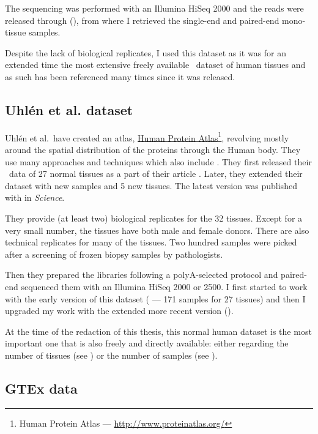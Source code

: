 The sequencing was performed with an Illumina HiSeq 2000 and the reads were
released through  (), from where I
retrieved the single-end and paired-end mono-tissue samples.

Despite the lack of biological replicates, I used this dataset as it was for an
extended time the most extensive freely available \Rnaseq\ dataset of human
tissues and as such has been referenced many times since it was released.

\subsection{Uhlén et al. dataset}

Uhlén et al.\ have created an atlas,
\href{http://www.proteinatlas.org/}{Human Protein Atlas}\footnote{%
Human Protein Atlas ---
\href{http://www.proteinatlas.org/}{http://www.proteinatlas.org/}},
revolving mostly around the spatial
distribution of the proteins through the Human body. They use many approaches
and techniques which also include \Rnaseq. They first released their \Rnaseq\
data of 27 normal tissues as a part of their article 
\citep{Uhlen2014}. Later, they extended their dataset with new samples and 5 new
tissues. The latest version was published with \paper{\citetitle{Uhlen2015}}
\citep{Uhlen2015} in \textit{Science}.

They provide (at least two) biological replicates for the 32 tissues.
Except for a very small number, the tissues have both male and female donors.
There are also technical replicates for many of the tissues. Two hundred samples
were picked after a screening of frozen biopsy samples by pathologists.

Then they prepared the libraries following a polyA-selected protocol and
paired-end sequenced them with an Illumina HiSeq 2000 or 2500. I first started
to work with the early version of this dataset
( --- 171 samples for 27 tissues)
and then I upgraded my work with the extended more recent version
(\ArrayExpress{E-MTAB-2836}).

At the time of the redaction of this thesis, this normal human dataset is the
most important one that is also freely and directly available: either regarding
the number of tissues (see \Cref{tab:Trans5DF})
or the number of samples (see ).


\subsection{GTEx data}

